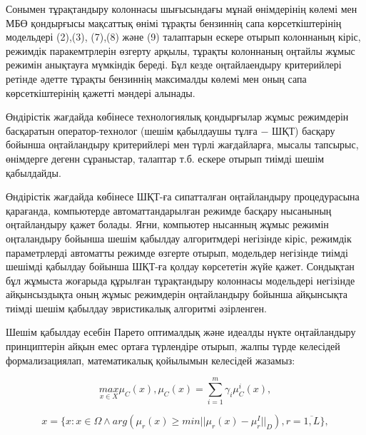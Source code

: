 \begin{multicols}{2}
Сонымен тұрақтандыру колоннасы шығысындағы мұнай өнімдерінің көлемі мен
МБӨ қондырғысы мақсаттық өнімі тұрақты бензиннің сапа көрсеткіштерінің
модельдері (2),(3), (7),(8) және (9) талаптарын ескере отырып колоннаның
кіріс, режимдік паракемтрлерін өзгерту арқылы, тұрақты колоннаның
оңтайлы жұмыс режимін анықтауға мүмкіндік береді. Бұл кезде
оңтайлаендыру критерийлері ретінде әдетте тұрақты бензиннің максималды
көлемі мен оның сапа көрсеткіштерінің қажетті мәндері алынады.

Өндірістік жағдайда көбінесе технологиялық қондырғылар жұмыс режимдерін
басқаратын оператор-технолог (шешім қабылдаушы тұлға − ШҚТ) басқару
бойынша оңтайландыру критерийлері мен түрлі жағдайларға, мысалы
тапсырыс, өнімдерге дегенн сұраныстар, талаптар т.б. ескере отырып
тиімді шешім қабылдайды.

Өндірістік жағдайда көбінесе ШҚТ-ға сипатталған оңтайландыру
процедурасына қарағанда, компьютерде автоматтандарылған режимде басқару
нысанының оңтайландыру қажет болады. Яғни, компьютер нысанның жұмыс
режимін оңталандыру бойынша шешім қабылдау алгоритмдері негізінде кіріс,
режимдік параметрлерді автоматты режимде өзгерте отырып, модельдер
негізінде тиімді шешімді қабылдау бойынша ШҚТ-ға қолдау көрсететін жүйе
қажет. Сондықтан бұл жұмыста жоғарыда құрылған тұрақтандыру колоннасы
модельдері негізінде айқынсыздықта оның жұмыс режимдерін оңтайландыру
бойынша айқынсықта тиімді шешім қабылдау эвристикалық алгоритмі
әзірленген.

Шешім қабылдау есебін Парето оптималдық және идеалды нүкте оңтайландыру
принциптерін айқын емес ортаға түрлендіре отырып, жалпы түрде келесідей
формализациялап, математикалық қойылымын келесідей жазамыз:
\end{multicols}

\begin{equation}
\underset{x\in X}{max}\mu_C(x),\mu_C(x)=\sum_{i=1}^m\gamma_i\mu_C^i(x),
\end{equation}

\begin{equation}
x = \{ x : x \in \Omega \wedge arg(\mu_r(x)\geq min ||\mu_r(x)-\mu_r^I||_D),r=\overline{1,L}\},
\end{equation}


